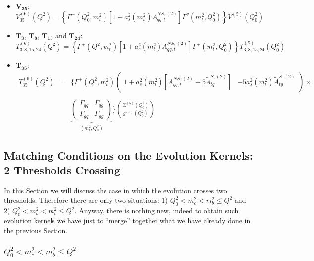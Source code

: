 \documentclass[10pt,a4paper]{article}
\begin{document}
\begin{itemize}
\begin{equation}
\end{equation}
\item $\mathbf{V_{35}}$:
\begin{equation}
V_{35}^{(6)}(Q^2)=\left\{\Gamma^{-}(Q_0^2,m_t^2)[1+a_s^2(m_t^2)A_{qq,t}^{N\!S,(2)}]\Gamma^{v}(m_t^2,Q_0^2)\right\}V^{(5)}(Q_0^2)
\end{equation}
\item $\mathbf{T_3}$, $\mathbf{T_8}$, $\mathbf{T_{15}}$ and $\mathbf{T_{24}}$:
\begin{equation}
T^{(6)}_{3,8,15,24}(Q^2)=\left\{\Gamma^{+}(Q^2,m_t^2)[1+a_s^2(m_t^2)A_{qq,t}^{N\!S,(2)}]\Gamma^{+}(m_t^2,Q_0^2)\right\}T^{(5)}_{3,8,15,24}(Q^2_0)
\end{equation}
\item $\mathbf{T_{35}}$:
\begin{equation}
\begin{array}{rcl}
\displaystyle T_{35}^{(6)}(Q^2)&=&\Bigg\{\Gamma^{+}(Q^2,m_t^2)\begin{pmatrix} 1+a_s^2(m_t^2)[A_{qq,t}^{N\!S,(2)}-5\tilde{A}^{S,(2)}_{tq}] & -5a_s^2(m_t^2)\tilde{A}^{S,(2)}_{tg}\end{pmatrix}\times\\
\\
 & & \displaystyle \underbrace{\begin{pmatrix}\Gamma_{qq}& \Gamma_{qg} \\ \Gamma_{gq} & \Gamma_{gg}\end{pmatrix}}_{(m_t^2,Q_0^2)}\Bigg\}{\Sigma^{(5)}(Q_0^2) \choose g^{(5)}(Q_0^2)}
\end{array}
\end{equation} 
\end{itemize}

\subsection{Matching Conditions on the Evolution Kernels: 2 Thresholds Crossing}

In this Section we will discuss the case in which the evolution
crosses two thresholds. Therefore there are only two situations: 1)
$Q_0^2<m_c^2<m_b^2\leq Q^2$ and 2) $Q_0^2<m_b^2<m_t^2\leq Q^2$.
Anyway, there is nothing new, indeed to obtain such evolution kernels
we have just to ``merge'' together what we have already done in the
previous Section.

\subsubsection{$Q_0^2<m_c^2<m_b^2\leq Q^2$}
\end{document}
